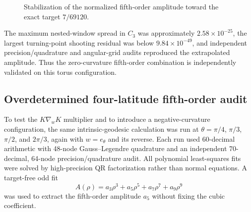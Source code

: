 \documentclass[11pt]{amsart}
\numberwithin{equation}{section}
\theoremstyle{remark}
\begin{document}
\begin{figure}[htbp]
\centering
{}
\caption{Stabilization of the normalized fifth-order amplitude toward the
exact target $7/69120$.}
\label{fig:rho5amplitude}
\end{figure}

The maximum nested-window spread in $C_3$ was approximately $2.58\times10^{-25}$, the largest turning-point shooting residual was below $9.84\times10^{-49}$, and independent precision/quadrature and angular-grid audits reproduced the extrapolated amplitude.  Thus the zero-curvature fifth-order combination is independently validated on this torus configuration.

\subsection{Overdetermined four-latitude fifth-order audit}
To test the $K\nabla_wK$ multiplier and to introduce a negative-curvature configuration, the same intrinsic-geodesic calculation was run at $\theta=\pi/4$, $\pi/3$, $\pi/2$, and $2\pi/3$, again with $w=e_\theta$ and its reverse.  Each run used 60-decimal arithmetic with 48-node Gauss--Legendre quadrature and an independent 70-decimal, 64-node precision/quadrature audit.  All polynomial least-squares fits were solved by high-precision QR factorization rather than normal equations.  A target-free odd fit
\[
A(\rho)=a_3\rho^3+a_5\rho^5+a_7\rho^7+a_9\rho^9
\]
was used to extract the fifth-order amplitude $a_5$ without fixing the cubic coefficient.
\end{document}
